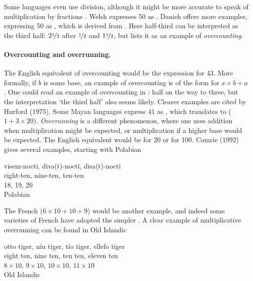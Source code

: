 \documentclass{../src/bcthesispart}
\begin{document}
Some languages even use division, although it might be more accurate to speak of multiplication by fractions \parencite{Comrie2011}.
Welsh expresses 50 as . 
Danish offers more examples, expressing 50 as , which is derived from . 
Here half-third can be interpreted as the third half: $2 \nicefrac{1}{2}$ after $\nicefrac{1}{2}$ and $1 \nicefrac{1}{2}$, but \textcite{Comrie2011} lists it as an example of \emph{overcounting}.




\paragraph{Overcounting and overrunning.}

The English equivalent of overcounting would be the expression for 43. 
More formally, if $b$ is some base, an example of overcounting is of the form  for $x\times b + a$. 
One could read an example of overcounting in : 
half on the way to three, but the interpretation ‘the third half’ also seems likely. 
Clearer examples are cited by Hurford (1975). 
Some Mayan languages express 41 as , which translates to  ($1+ 3\times 20$). 
\emph{Overrunning} is a different phenomenon, where one uses addition when multiplication might be expected, or multiplication if a higher base would be expected. 
The English equivalent would be  for 20 or  for 100. 
Comrie (1992) gives several examples, starting with Polabian
\begin{exe}
	\ex\glll%
	visem-nocti, diva(t)-nocti, disa(t)-nocti\\
	eight-ten, nine-ten, ten-ten\\
	18, 19, 20\\
	\hfill Polabian
\end{exe}
The French  ($6 \times 10 + 10 + 9$) would be another example, and indeed some varieties of French have adopted the simpler . 
A clear example of multiplicative overrunning can be found in Old Islandic
\begin{exe}
	\ex\glll%
	{otto tiger}, {níu tiger}, {tío tiger}, {ellefo tiger}\\
	{eight ten}, {nine ten}, {ten ten}, {eleven ten}\\
	{$8\times 10$}, {$9 \times 10$}, {$10\times 10$}, {$11\times 10$}\\
	\hfill Old Islandic
\end{exe}
\end{document}
